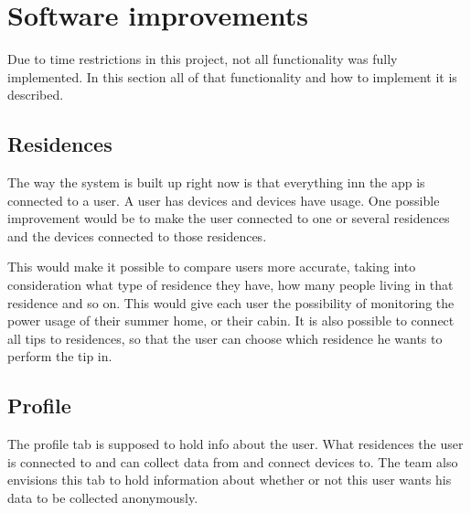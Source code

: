 \section{Software improvements}
Due to time restrictions in this project, not all functionality was fully implemented. In this section all of that functionality and how to implement it is described. 

\subsection{Residences}
The way the system is built up right now is that everything inn the app is connected to a user. A user has devices and devices have usage. One possible improvement would be to make the user connected to one or several residences and the devices connected to those residences. 

This would make it possible to compare users more accurate, taking into consideration what type of residence they have, how many people living in that residence and so on. This would give each user the possibility of monitoring the power usage of their summer home, or their cabin. It is also possible to connect all tips to residences, so that the user can choose which residence he wants to perform the tip in. 

\subsection{Profile}

The profile tab is supposed to hold info about the user. What residences the user is connected to and can collect data from and connect devices to. The team also envisions this tab to hold information about whether or not this user wants his data to be collected anonymously. 


